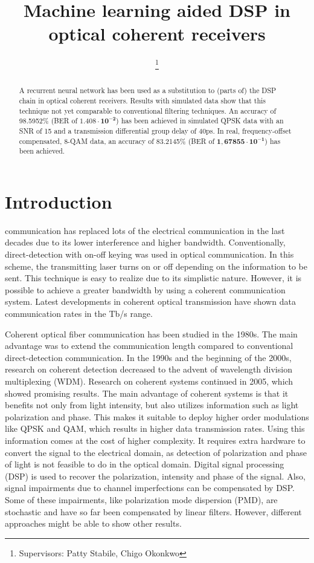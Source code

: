 \documentclass[journal,10pt,twoside, a4paper]{IEEEtran}
\title{Machine learning aided DSP in optical coherent receivers}
\author{
    \IEEEauthorblockN{L.H.P. Driessen\\}
    \IEEEauthorblockA{l.h.p.driessen@student.tue.nl, ID 0962549}
    \thanks{
        Supervisors: Patty Stabile, Chigo Okonkwo
    }
}
\begin{document}
\maketitle

\begin{abstract}
    A recurrent neural network has been used as a substitution to (parts of) the DSP chain in optical coherent receivers. Results with simulated data show that this technique not yet comparable to conventional filtering techniques. An accuracy of 98.5952\% (BER of $\mathbf{1.408\cdot 10^{-2}}$) has been achieved in simulated QPSK data with an SNR of 15 and a transmission differential group delay of 40ps. In real, frequency-offset compensated, 8-QAM data, an accuracy of 83.2145\% (BER of $\mathbf{1,67855\cdot 10^{-1}}$) has been achieved.
\end{abstract}

\section{Introduction}
 communication has replaced lots of the electrical communication in the last decades due to its lower interference and higher bandwidth. Conventionally, direct-detection with on-off keying was used in optical communication. In this scheme, the transmitting laser turns on or off depending on the information to be sent. This technique is easy to realize due to its simplistic nature. However, it is possible to achieve a greater bandwidth by using a coherent communication system\cite{coherent_detection,DSP_beyond}. Latest developments in coherent optical transmission have shown data communication rates in the Tb/s range\cite{coherent_detection, DSP_beyond, dsp+ml}.

Coherent optical fiber communication has been studied in the 1980s. The main advantage was to extend the communication length compared to conventional direct-detection communication\cite{coherent_detection}. In the 1990s and the beginning of the 2000s, research on coherent detection decreased to the advent of wavelength division multiplexing (WDM). Research on coherent systems continued in 2005, which showed promising results\cite{continue}. The main advantage of coherent systems is that it benefits not only from light intensity, but also utilizes information such as light polarization and phase. This makes it suitable to deploy higher order modulations like QPSK and QAM, which results in higher data transmission rates. Using this information comes at the cost of higher complexity. It requires extra hardware to convert the signal to the electrical domain, as detection of polarization and phase of light is not feasible to do in the optical domain\cite{coherent_detection}. Digital signal processing (DSP) is used to recover the polarization, intensity and phase of the signal. Also, signal impairments due to channel imperfections can be compensated by DSP\cite{coherent_detection, DSP_2, DSP_beyond}. Some of these impairments, like polarization mode dispersion (PMD), are stochastic\cite{nonlinear} and have so far been compensated by linear filters. However, different approaches might be able to show other results.
\end{document}
